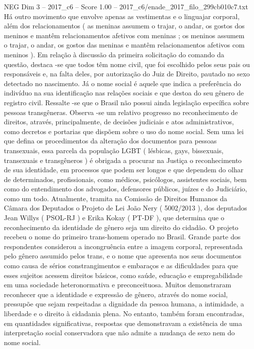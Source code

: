 \begin{textsample}{NEG Dim 3 – 2017\_c6 – Score 1.00 – 2017\_c6/enade\_2017\_filo\_299cb010c7.txt}
Há outro movimento que envolve apenas as vestimentas e o linguajar corporal, além dos relacionamentos ( as meninas assumem o trajar, o andar, os gostos dos meninos e mantêm relacionamentos afetivos com meninas ; os meninos assumem o trajar, o andar, os gostos das meninas e mantêm relacionamentos afetivos com meninos ).
Em relação à discussão da primeira solicitação do comando da questão, destaca -se que todos têm nome civil, que foi escolhido pelos seus pais ou responsáveis e, na falta deles, por autorização do Juiz de Direito, pautado no sexo detectado no nascimento.
Já o nome social é aquele que indica a preferência do indivíduo na sua identificação nas relações sociais e que destoa do seu gênero de registro civil.
Ressalte -se que o Brasil não possui ainda legislação específica sobre pessoas transgêneras.
Observa -se um relativo progresso no reconhecimento de direitos, através, principalmente, de decisões judiciais e atos administrativos, como decretos e portarias que dispõem sobre o uso do nome social.
Sem uma lei que defina os procedimentos da alteração dos documentos para pessoas transexuais, essa parcela da população LGBT ( lésbicas, gays, bissexuais, transexuais e transgêneros ) é obrigada a procurar na Justiça o reconhecimento de sua identidade, em processos que podem ser longos e que dependem do olhar de determinados, profissionais, como médicos, psicólogos, assistentes sociais, bem como do entendimento dos advogados, defensores públicos, juízes e do Judiciário, como um todo.
Atualmente, tramita na Comissão de Direitos Humanos da Câmara dos Deputados o Projeto de Lei João Nery ( 5002/2013 ), dos deputados Jean Willys ( PSOL-RJ ) e Erika Kokay ( PT-DF ), que determina que o reconhecimento da identidade de gênero seja um direito do cidadão.
O projeto recebeu o nome do primeiro trans-homem operado no Brasil.
Grande parte dos respondentes considerou a incongruência entre a imagem corporal, representada pelo gênero assumido pelos trans, e o nome que apresenta nos seus documentos como causa de sérios constrangimentos e embaraços e as dificuldades para que esses sujeitos acessem direitos básicos, como saúde, educação e empregabilidade em uma sociedade heteronormativa e preconceituosa.
Muitos demonstraram reconhecer que a identidade e expressão de gênero, através do nome social, pressupõe que sejam respeitadas a dignidade da pessoa humana, a intimidade, a liberdade e o direito à cidadania plena.
No entanto, também foram encontradas, em quantidades significativas, respostas que demonstravam a existência de uma interpretação social conservadora que não admite a mudança de sexo nem do nome social.

\end{textsample}
